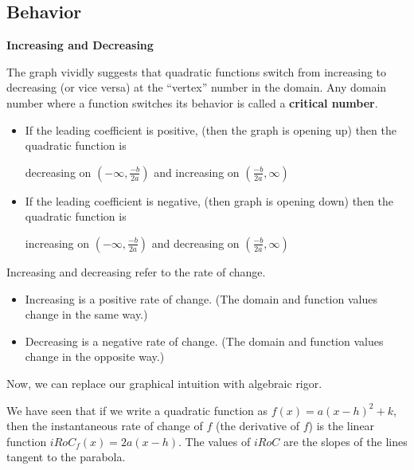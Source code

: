 \documentclass{ximera}
\begin{document}
\subsection*{Behavior}



\textbf{\textcolor{blue!55!black}{Increasing and Decreasing}}






The graph vividly suggests that quadratic functions switch from increasing to decreasing (or vice versa) at the ``vertex'' number in the domain. Any domain number where a function switches its behavior is called a \textbf{\textcolor{blue!55!black}{critical number}}.


\begin{itemize}
\item If the leading coefficient is positive, (then the graph is opening up) then the quadratic function is 

decreasing on $\left( -\infty, \frac{-b}{2a} \right)$ and increasing on $\left( \frac{-b}{2a}, \infty \right)$

\item If the leading coefficient is negative, (then graph is opening down) then the quadratic function is 

increasing on $\left( -\infty, \frac{-b}{2a} \right)$ and decreasing on $\left( \frac{-b}{2a}, \infty \right)$
\end{itemize}





Increasing and decreasing refer to the rate of change.


\begin{itemize}
\item Increasing is a positive rate of change. (The domain and function values change in the same way.)
\item Decreasing is a negative rate of change. (The domain and function values change in the opposite way.)
\end{itemize}



Now, we can replace our graphical intuition with algebraic rigor. 


We have seen that if we write a quadratic function as $f(x) = a (x - h)^2 + k$, then the instantaneous rate of change of $f$ (the derivative of $f$) is the linear function $iRoC_f(x) = 2 a (x - h)$. The values of $iRoC$ are the slopes of the lines tangent to the parabola.
\end{document}
